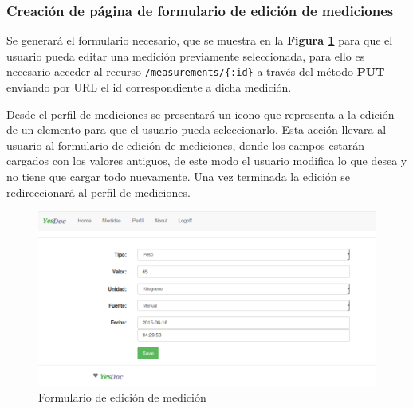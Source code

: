 \documentclass[a4paper,12pt]{article}
\begin{document}
\subsubsection{ Creación de página de formulario de edición de mediciones}
Se generará el formulario necesario, que se muestra en la \textbf{Figura \ref{editar_medicion}} para que el usuario pueda editar una medición previamente seleccionada, para ello es necesario acceder al recurso \texttt{/measurements/\{:id\}} a través del método \textbf{PUT} enviando por URL el id correspondiente a dicha medición. 

Desde el perfil de mediciones se presentará un icono que representa a la edición de un elemento para que el usuario pueda seleccionarlo. Esta acción llevara al usuario al formulario de edición de mediciones, donde los campos estarán cargados con los valores antiguos, de este modo el usuario modifica lo que desea y no tiene que cargar todo nuevamente. Una vez terminada la edición se redireccionará al perfil de mediciones.

	\begin{figure}[h]
        \centering
        \includegraphics[width=1\textwidth]{img/2-editar_medicion}
        \caption{Formulario de edición de medición}
		\label{editar_medicion}
    \end{figure}
    

\end{document}
